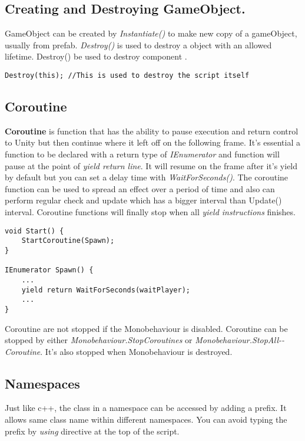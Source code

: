 \documentclass[10pt, a4paper]{article}
\begin{document}
        \subsection{Creating and Destroying GameObject.}
            GameObject can be created by \emph{Instantiate()} to make new copy of a gameObject, usually from prefab. \emph{Destroy()} is used to destroy a object with an allowed lifetime. Destroy() be used to destroy component . 
\begin{lstlisting}
Destroy(this); //This is used to destroy the script itself
\end{lstlisting}
        
        \subsection{Coroutine}
            \textbf{Coroutine} is function that has the ability to pause execution and return control to Unity but then continue where it left off on the following frame. It's essential a function to be declared with a return type of \emph{IEnumerator} and function will pause at the point of \emph{yield return line}. It will resume on the frame after it's yield by default but you can set a delay time with \emph{WaitForSeconds()}. The coroutine function can be used to spread an effect over a period of time and also can perform regular check and update which has a bigger interval than Update() interval. Coroutine functions will finally stop when all \emph{yield instructions} finishes.
\begin{lstlisting}
void Start() {
    StartCoroutine(Spawn); 
}

IEnumerator Spawn() {
    ...
    yield return WaitForSeconds(waitPlayer); 
    ...
}
\end{lstlisting}

            Coroutine are not stopped if the Monobehaviour is disabled. Coroutine can be stopped by either \emph{Monobehaviour.StopCoroutines} or \emph{Monobehaviour.StopAll-\newline \noindent -Coroutine}. It's also stopped when Monobehaviour is destroyed.
        \subsection{Namespaces}
            Just like c++, the class in a namespace can be accessed by adding a prefix. It allows same class name within different namespaces. You can avoid typing the prefix by \emph{using} directive at the top of the script. 
\end{document}
